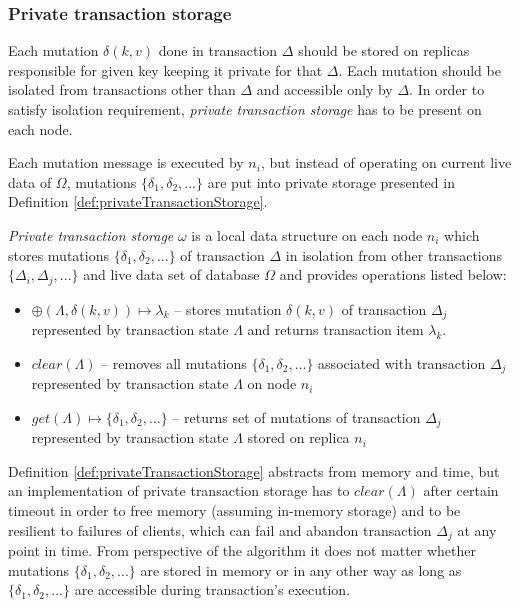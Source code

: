 \documentclass[runningheads,a4paper]{llncs}
\newcommand{\transaction}{$\Delta$\xspace}
\newcommand{\transactionj}{$\Delta_{j}$\xspace}
\newcommand{\transactions}{$\{\Delta_{i}, \Delta_{j}, ...\}$\xspace}
\newcommand{\database}{$\Omega$\xspace}
\newcommand{\mutation}[2]{$\delta(#1, #2)$\xspace}
\newcommand{\mutations}{$\{\delta_{1}, \delta_{2}, ...\}$\xspace}
\newcommand{\txItemi}[1]{$\lambda_{#1}$\xspace}
\newcommand{\txState}{$\Lambda$\xspace}
\newcommand{\txStorage}{$\omega$\xspace}
\newcommand{\node}[1]{$n_{#1}$\xspace}
\begin{document}
\subsubsection{Private transaction storage}
\label{sec:mpp:privateTxStorage}

Each mutation \mutation{k}{v} done in transaction \transaction should be stored on replicas responsible for given key keeping it private for that \transaction. Each mutation should be isolated from transactions other than \transaction and accessible only by \transaction. In order to satisfy isolation requirement, \emph{private transaction storage} has to be present on each node.

Each mutation message is executed by \node{i}, but instead of operating on current live data of \database, mutations \mutations are put into private storage presented in Definition \ref{def:privateTransactionStorage}. 

\begin{definition}
  \label{def:privateTransactionStorage}
  \emph{Private transaction storage} \txStorage is a local data structure on each node \node{i} which stores mutations \mutations of transaction \transaction in isolation from other transactions \transactions and live data set of database \database and provides operations listed below: 
  \begin{itemize}
    \item $\oplus(\text{\txState}, \text{\mutation{k}{v}}) \mapsto \text{\txItemi{k}}$ -- stores mutation \mutation{k}{v} of transaction \transactionj represented by transaction state \txState and returns transaction item \txItemi{k}. 
    \item $\mathit{clear}(\text{\txState})$ -- removes all mutations \mutations associated with transaction \transactionj represented by transaction state \txState on node \node{i}
    \item $\mathit{get}(\text{\txState}) \mapsto \text{\mutations}$ -- returns set of mutations of transaction \transactionj represented by transaction state \txState stored on replica \node{i} 
  \end{itemize}
\end{definition}

Definition \ref{def:privateTransactionStorage} abstracts from memory and time, but an implementation of private transaction storage has to $\mathit{clear}(\text{\txState})$ after certain timeout in order to free memory (assuming in-memory storage) and to be resilient to failures of clients, which can fail and abandon transaction \transactionj at any point in time. From perspective of the algorithm it does not matter whether mutations \mutations are stored in memory or in any other way as long as \mutations are accessible during transaction's execution. 
\end{document}
